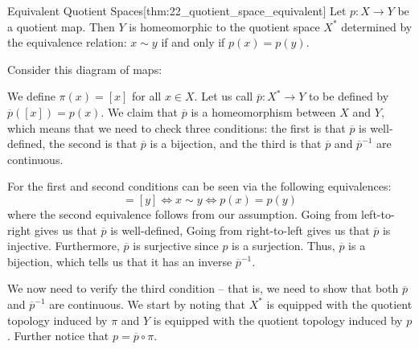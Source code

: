 \begin{thmBox}{Equivalent Quotient Spaces}[thm:22_quotient_space_equivalent]
    Let \( p: X \rightarrow Y \) be a quotient map.
    Then \( Y \) is homeomorphic to the quotient space \( X^{ * } \) determined
    by the equivalence relation: \( x \sim y \) if and only if 
    \( p ( x ) = p ( y ) \).

    \baseRule

    \begin{proofBox}
        Consider this diagram of maps:
        \begin{center}
        \end{center}
        We define \( \pi ( x ) = [ x ] \) for all \( x \in X \).
        Let us call \( \overline{ p }: X^{ * } \rightarrow Y \) to be defined by
        \( \overline{ p } ( [ x ] ) = p ( x ) \).
        We claim that \( \overline{ p } \) is a homeomorphism between \( X \)
        and \( Y \), which means that we need to check three conditions:
        the first is that \( \overline{ p } \) is well-defined,
        the second is that \( \overline{ p } \) is a bijection, and the third 
        is that \( \overline{ p } \) and \( \overline{ p }^{ -1 } \) are 
        continuous.

        \baseSkip

        For the first and second conditions can be seen via the following
        equivalences:
        \begin{equation*}
            [ x ] = [ y ]
            \iff 
            x \sim y
            \iff 
            p ( x ) = p ( y )
        \end{equation*}
        where the second equivalence follows from our assumption.
        Going from left-to-right gives us that \( \overline{ p } \) is 
        well-defined,
        Going from right-to-left gives us that \( \overline{ p } \) is 
        injective.
        Furthermore, \( \overline{ p } \) is surjective since \( p \) is a
        surjection.
        Thus, \( \overline{ p } \) is a bijection, which tells us that it has 
        an inverse \( \overline{ p }^{ -1 } \).

        \baseSkip

        We now need to verify the third condition -- that is, we need to show 
        that both \( \overline{ p } \) and \( \overline{ p }^{ -1 } \) are
        continuous. 
        We start by noting that
        \( X^{ * } \) is equipped with the quotient topology induced by 
        \( \pi \) and \( Y \) is equipped with the quotient topology induced 
        by \( p \).
        Further notice that \( p = \overline{ p } \circ \pi \).


\end{proofBox}
\end{thmBox}
